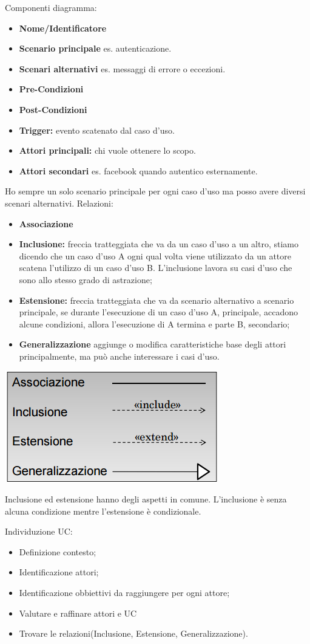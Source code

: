 Componenti diagramma:
\begin{itemize}
	\item \textbf{Nome/Identificatore}
	\item \textbf{Scenario principale} es. autenticazione.
	\item \textbf{Scenari alternativi} es. messaggi di errore o eccezioni.
	\item \textbf{Pre-Condizioni}
	\item \textbf{Post-Condizioni}
	\item \textbf{Trigger:} evento scatenato dal caso d'uso.
	\item \textbf{Attori principali:} chi vuole ottenere lo scopo.
	\item \textbf{Attori secondari} es. facebook quando autentico esternamente.
\end{itemize}
Ho sempre un solo scenario principale per ogni caso d'uso ma posso avere diversi scenari alternativi.
Relazioni:
\begin{itemize}
	\item \textbf{Associazione}
	\item \textbf{Inclusione:} freccia tratteggiata che va da un caso d'uso a un altro, stiamo dicendo che un caso d'uso A ogni qual volta viene utilizzato da un attore scatena l'utilizzo di un caso d'uso B. L'inclusione lavora su casi d'uso che sono allo stesso grado di astrazione;
	\item \textbf{Estensione:} freccia tratteggiata che va da scenario alternativo a scenario principale, se durante l'esecuzione di un caso d'uso A, principale, accadono alcune condizioni, allora l'esecuzione di A termina e parte B, secondario;
	\item \textbf{Generalizzazione} aggiunge o modifica caratteristiche base degli attori principalmente, ma può anche interessare i casi d'uso.
\end{itemize} 
\includegraphics[width=0.75\columnwidth]{img9}

Inclusione ed estensione hanno degli aspetti in comune. L'inclusione è senza alcuna condizione mentre l'estensione è condizionale.

Individuzione UC:
\begin{itemize}
	\item Definizione contesto;
	\item Identificazione attori;
	\item Identificazione obbiettivi da raggiungere per ogni attore;
	\item Valutare e raffinare attori e UC
	\item Trovare le relazioni(Inclusione, Estensione, Generalizzazione).
\end{itemize}

